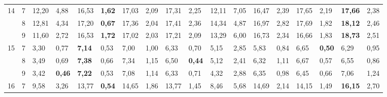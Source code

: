 \documentclass[conference]{IEEEtran}
\begin{document}
\begin{table}[]
\begin{tabular}{|cl|ll|ll|ll|ll|ll|ll|ll|ll|}
		\multicolumn{1}{|c|}{\multirow{3}{*}{14}} & 7 & \multicolumn{1}{l|}{12,20} & 4,88 & \multicolumn{1}{l|}{16,53} & \textbf{1,62} & \multicolumn{1}{l|}{17,03} & 2,09 & \multicolumn{1}{l|}{17,31} & 2,25 & \multicolumn{1}{l|}{12,11} & 7,05 & \multicolumn{1}{l|}{16,47} & 2,39 & \multicolumn{1}{l|}{17,65} & 2,19 & \multicolumn{1}{l|}{\textbf{17,66}} & 2,38 \\ \cline{2-18} 
		\multicolumn{1}{|c|}{} & 8 & \multicolumn{1}{l|}{12,81} & 4,34 & \multicolumn{1}{l|}{17,20} & \textbf{0,67} & \multicolumn{1}{l|}{17,36} & 2,04 & \multicolumn{1}{l|}{17,41} & 2,36 & \multicolumn{1}{l|}{14,34} & 4,87 & \multicolumn{1}{l|}{16,97} & 2,82 & \multicolumn{1}{l|}{17,69} & 1,82 & \multicolumn{1}{l|}{\textbf{18,12}} & 2,46 \\ \cline{2-18} 
		\multicolumn{1}{|c|}{} & 9 & \multicolumn{1}{l|}{11,60} & 2,72 & \multicolumn{1}{l|}{16,53} & \textbf{1,72} & \multicolumn{1}{l|}{17,02} & 2,03 & \multicolumn{1}{l|}{17,21} & 2,09 & \multicolumn{1}{l|}{13,29} & 6,00 & \multicolumn{1}{l|}{16,73} & 2,34 & \multicolumn{1}{l|}{16,66} & 1,83 & \multicolumn{1}{l|}{\textbf{18,73}} & 2,51 \\ \hline
		\multicolumn{1}{|c|}{\multirow{3}{*}{15}} & 7 & \multicolumn{1}{l|}{3,30} & 0,77 & \multicolumn{1}{l|}{\textbf{7,14}} & 0,53 & \multicolumn{1}{l|}{7,00} & 1,00 & \multicolumn{1}{l|}{6,33} & 0,70 & \multicolumn{1}{l|}{5,15} & 2,85 & \multicolumn{1}{l|}{5,83} & 0,84 & \multicolumn{1}{l|}{6,65} & \textbf{0,50} & \multicolumn{1}{l|}{6,29} & 0,95 \\ \cline{2-18} 
		\multicolumn{1}{|c|}{} & 8 & \multicolumn{1}{l|}{3,49} & 0,69 & \multicolumn{1}{l|}{\textbf{7,38}} & 0,66 & \multicolumn{1}{l|}{7,34} & 1,15 & \multicolumn{1}{l|}{6,50} & \textbf{0,44} & \multicolumn{1}{l|}{5,12} & 2,41 & \multicolumn{1}{l|}{6,32} & 1,11 & \multicolumn{1}{l|}{6,67} & 0,57 & \multicolumn{1}{l|}{6,55} & 0,86 \\ \cline{2-18} 
		\multicolumn{1}{|c|}{} & 9 & \multicolumn{1}{l|}{3,42} & \textbf{0,46} & \multicolumn{1}{l|}{\textbf{7,22}} & 0,53 & \multicolumn{1}{l|}{7,08} & 1,14 & \multicolumn{1}{l|}{6,33} & 0,71 & \multicolumn{1}{l|}{4,32} & 2,88 & \multicolumn{1}{l|}{6,35} & 0,98 & \multicolumn{1}{l|}{6,45} & 0,66 & \multicolumn{1}{l|}{7,06} & 1,24 \\ \hline
		\multicolumn{1}{|c|}{\multirow{3}{*}{16}} & 7 & \multicolumn{1}{l|}{9,58} & 3,26 & \multicolumn{1}{l|}{13,77} & \textbf{0,54} & \multicolumn{1}{l|}{14,65} & 1,86 & \multicolumn{1}{l|}{13,77} & 1,45 & \multicolumn{1}{l|}{8,46} & 5,68 & \multicolumn{1}{l|}{14,69} & 2,14 & \multicolumn{1}{l|}{14,15} & 1,49 & \multicolumn{1}{l|}{\textbf{16,15}} & 2,70 \\ \cline{2-18} 

\end{tabular}
\end{table}
\end{document}

